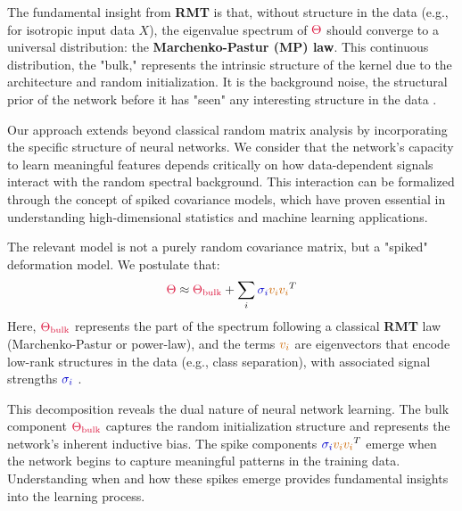 \documentclass[a4paper]{article}
\theoremstyle{plain}
\theoremstyle{definition}
\theoremstyle{remark}
\begin{document}
\begin{tcolorbox}[colback=green!10,colframe=green!60!black,title={\textbf{💡 KEY INSIGHT: Universal Distribution}},enhanced,drop shadow]
The fundamental insight from \textcolor{purple!80!black}{\textbf{RMT}} is that, without structure in the data (e.g., for isotropic input data $X$), the eigenvalue spectrum of $\textcolor{kernelcolor}{\Theta}$ should converge to a universal distribution: the \textcolor{orange!80!black}{\textbf{Marchenko-Pastur (MP) law}}. This continuous distribution, the "bulk," represents the intrinsic structure of the kernel due to the architecture and random initialization. It is the background noise, the structural prior of the network before it has "seen" any interesting structure in the data \cite{bach2017breaking}.
\end{tcolorbox}

Our approach extends beyond classical random matrix analysis by incorporating the specific structure of neural networks. We consider that the network's capacity to learn meaningful features depends critically on how data-dependent signals interact with the random spectral background. This interaction can be formalized through the concept of spiked covariance models, which have proven essential in understanding high-dimensional statistics and machine learning applications.

\begin{tcolorbox}[colback=yellow!10,colframe=yellow!60!black,title={\textbf{📖 DEFINITION: Spiked Covariance Model}},enhanced,drop shadow]
The relevant model is not a purely random covariance matrix, but a "spiked" deformation model. We postulate that:
\[
\textcolor{kernelcolor}{\Theta} \approx \textcolor{kernelcolor}{\Theta_{\text{bulk}}} + \sum_{i} \textcolor{blue!80!black}{\sigma_i} \textcolor{orange!80!black}{v_i} \textcolor{orange!80!black}{v_i}^T
\]
Here, $\textcolor{kernelcolor}{\Theta_{\text{bulk}}}$ represents the part of the spectrum following a classical \textcolor{purple!80!black}{\textbf{RMT}} law (Marchenko-Pastur or power-law), and the terms $\textcolor{orange!80!black}{v_i}$ are eigenvectors that encode low-rank structures in the data (e.g., class separation), with associated signal strengths $\textcolor{blue!80!black}{\sigma_i}$ \cite{doumeche2023sobolev}.
\end{tcolorbox}

This decomposition reveals the dual nature of neural network learning. The bulk component $\textcolor{kernelcolor}{\Theta_{\text{bulk}}}$ captures the random initialization structure and represents the network's inherent inductive bias. The spike components $\textcolor{blue!80!black}{\sigma_i} \textcolor{orange!80!black}{v_i} \textcolor{orange!80!black}{v_i}^T$ emerge when the network begins to capture meaningful patterns in the training data. Understanding when and how these spikes emerge provides fundamental insights into the learning process.
\end{document}

